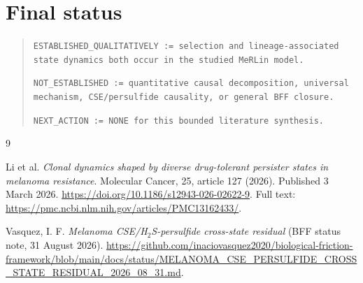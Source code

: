 \documentclass[11pt]{article}
\begin{document}
\section{Final status}

\begin{quote}
\texttt{ESTABLISHED\_QUALITATIVELY := selection and lineage-associated state dynamics both occur in the studied MeRLin model.}

\texttt{NOT\_ESTABLISHED := quantitative causal decomposition, universal mechanism, CSE/persulfide causality, or general BFF closure.}

\texttt{NEXT\_ACTION := NONE for this bounded literature synthesis.}
\end{quote}

\begin{thebibliography}{9}

Li et al.
\newblock \emph{Clonal dynamics shaped by diverse drug-tolerant persister states in melanoma resistance}.
\newblock Molecular Cancer, 25, article 127 (2026).
\newblock Published 3 March 2026.
\newblock \url{https://doi.org/10.1186/s12943-026-02622-9}.
\newblock Full text: \url{https://pmc.ncbi.nlm.nih.gov/articles/PMC13162433/}.

Vasquez, I. F.
\newblock \emph{Melanoma CSE/H$_2$S-persulfide cross-state residual} (BFF status note, 31 August 2026).
\newblock \url{https://github.com/inaciovasquez2020/biological-friction-framework/blob/main/docs/status/MELANOMA_CSE_PERSULFIDE_CROSS_STATE_RESIDUAL_2026_08_31.md}.

\end{thebibliography}
\end{document}
